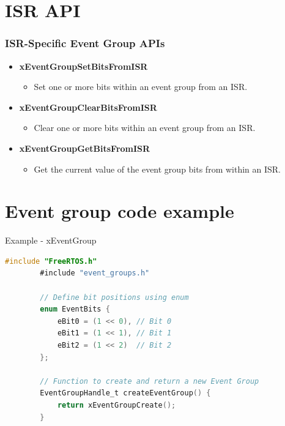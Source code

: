 \documentclass[10pt]{beamer}
\begin{document}
\section{ISR API}
\begin{frame}
    \frametitle{ISR-Specific Event Group APIs}
    \begin{itemize}
      \item \textbf{xEventGroupSetBitsFromISR}
      \begin{itemize}
        \item Set one or more bits within an event group from an ISR.
      \end{itemize}
      \item \textbf{xEventGroupClearBitsFromISR}
      \begin{itemize}
        \item Clear one or more bits within an event group from an ISR.
      \end{itemize}
      \item \textbf{xEventGroupGetBitsFromISR}
      \begin{itemize}
        \item Get the current value of the event group bits from within an ISR.
      \end{itemize}
    \end{itemize}
  \end{frame}

\section{Event group code example}


\begin{frame}[fragile]{Example - xEventGroup}
    
    \begin{lstlisting}[language=C, caption=setup]
        #include "FreeRTOS.h"
        #include "event_groups.h"
        
        // Define bit positions using enum
        enum EventBits {
            eBit0 = (1 << 0), // Bit 0
            eBit1 = (1 << 1), // Bit 1
            eBit2 = (1 << 2)  // Bit 2
        };
        
        // Function to create and return a new Event Group
        EventGroupHandle_t createEventGroup() {
            return xEventGroupCreate();
        }
    \end{lstlisting}
\end{frame}
\end{document}
